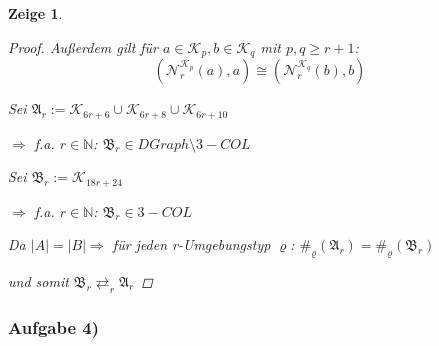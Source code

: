 \documentclass[12pt]{article}
\newtheorem{zeige}{Zeige}
\begin{document}
\begin{zeige}
\begin{proof}
    Außerdem gilt für $a\in \mathcal{K}_p,b\in \mathcal{K}_q$ mit $p,q\geq r+1$: 
    $$(\mathcal{N}_r^{\mathcal{K}_p}(a),a) \cong (\mathcal{N}_r^{\mathcal{K}_q}(b),b)$$
    
    
    Sei $\mathfrak{A}_r := \mathcal{K}_{6r+6}\cup \mathcal{K}_{6r+8} \cup \mathcal{K}_{6r+10}$
    
    $\Rightarrow $ f.a. $r\in \mathbb{N}$: $\mathfrak{B}_r\in DGraph\setminus 3-COL$
    
    Sei $\mathfrak{B}_r := \mathcal{K}_{18r+24}$
    
    $\Rightarrow $ f.a. $r\in \mathbb{N}$: $\mathfrak{B}_r\in 3-COL$
    
    Da $|A| = |B| \Rightarrow $ für jeden r-Umgebungstyp $\varrho$: $ \#_\varrho(\mathfrak{A}_r)=\#_\varrho(\mathfrak{B}_r) $
    
    und somit $\mathfrak{B}_r\rightleftarrows_r \mathfrak{A}_r$
    
  \end{proof}
\end{zeige}
\subsubsection*{Aufgabe 4)}
\end{document}
